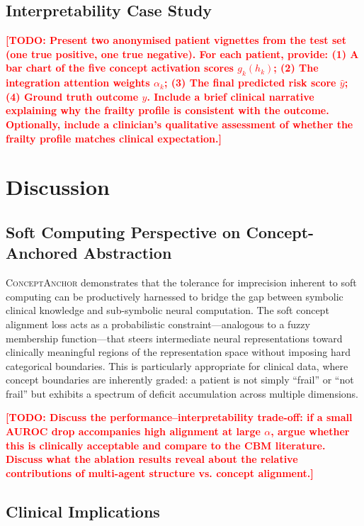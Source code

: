 \documentclass[review,12pt,authoryear]{elsarticle}
\newcommand{\todo}[1]{\textcolor{red}{\textbf{[TODO: #1]}}}
\newcommand{\modelname}{\textsc{ConceptAnchor}}
\begin{document}
\subsection{Interpretability Case Study}

\todo{Present two anonymised patient vignettes from the test set (one true positive, one true negative).
For each patient, provide: (1) A bar chart of the five concept activation scores $g_k(h_k)$; (2) The integration attention weights $\alpha_k$; (3) The final predicted risk score $\hat{y}$; (4) Ground truth outcome $y$.
Include a brief clinical narrative explaining why the frailty profile is consistent with the outcome.
Optionally, include a clinician's qualitative assessment of whether the frailty profile matches clinical expectation.}

\section{Discussion}
\label{sec:discussion}

\subsection{Soft Computing Perspective on Concept-Anchored Abstraction}

\modelname{} demonstrates that the tolerance for imprecision inherent to soft computing \citep{zadeh1994soft} can be productively harnessed to bridge the gap between symbolic clinical knowledge and sub-symbolic neural computation.
The soft concept alignment loss acts as a probabilistic constraint—analogous to a fuzzy membership function—that steers intermediate neural representations toward clinically meaningful regions of the representation space without imposing hard categorical boundaries.
This is particularly appropriate for clinical data, where concept boundaries are inherently graded: a patient is not simply ``frail'' or ``not frail'' but exhibits a spectrum of deficit accumulation across multiple dimensions.

\todo{Discuss the performance–interpretability trade-off: if a small AUROC drop accompanies high alignment at large $\alpha$, argue whether this is clinically acceptable and compare to the CBM literature. Discuss what the ablation results reveal about the relative contributions of multi-agent structure vs. concept alignment.}

\subsection{Clinical Implications}
\end{document}
